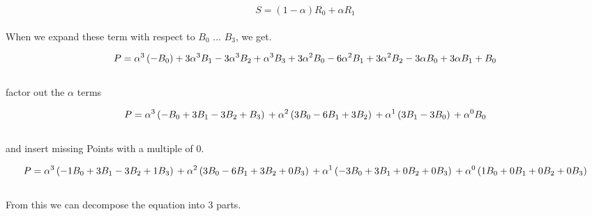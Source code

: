 \begin{equation*}
    S=(1-\alpha ) R_0+\alpha  R_1
\end{equation*}
\\
When we expand these term with respect to $B_0$ ... $B_3$, we get.

\begin{equation*}
    P=\alpha ^3 \left(-B_0\right)+3 \alpha ^3 B_1-3 \alpha ^3 B_2+\alpha ^3 B_3+ \\
    3 \alpha ^2 B_0-6 \alpha ^2 B_1+3 \alpha ^2 B_2                              \\
    -3 \alpha  B_0+3 \alpha  B_1+                                                \\
    B_0
\end{equation*}
\\
factor out the $\alpha$ terms

\begin{equation*}
    P=\alpha ^3 \left(-B_0+3 B_1-3 B_2+B_3\right) \\
    +\alpha ^2 \left(3 B_0-6 B_1+3 B_2\right)     \\
    +\alpha ^1 \left(3 B_1-3 B_0\right)           \\
    +\alpha ^0 B_0
\end{equation*}
\\
and insert missing Points with a multiple of 0.

\begin{equation*}
    P=\alpha ^3 \left(-1 B_0+3 B_1-3 B_2+1 B_3\right) \\
    +\alpha ^2 \left( 3 B_0-6 B_1+3 B_2+0 B_3\right)  \\
    +\alpha ^1 \left(-3 B_0+3 B_1+0 B_2+0 B_3\right)  \\
    +\alpha ^0 \left( 1 B_0+0 B_1+0 B_2+0 B_3\right)
\end{equation*}
\\
From this we can decompose the equation into 3 parts.

